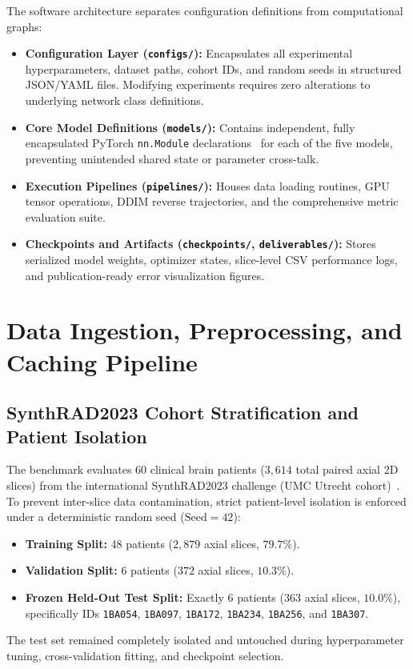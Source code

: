 The software architecture separates configuration definitions from computational graphs:
\begin{itemize}
    \item \textbf{Configuration Layer (\texttt{configs/}):} Encapsulates all experimental hyperparameters, dataset paths, cohort IDs, and random seeds in structured JSON/YAML files. Modifying experiments requires zero alterations to underlying network class definitions.
    \item \textbf{Core Model Definitions (\texttt{models/}):} Contains independent, fully encapsulated PyTorch \texttt{nn.Module} declarations~\cite{paszke2019pytorch} for each of the five models, preventing unintended shared state or parameter cross-talk.
    \item \textbf{Execution Pipelines (\texttt{pipelines/}):} Houses data loading routines, GPU tensor operations, DDIM reverse trajectories, and the comprehensive metric evaluation suite.
    \item \textbf{Checkpoints and Artifacts (\texttt{checkpoints/}, \texttt{deliverables/}):} Stores serialized model weights, optimizer states, slice-level CSV performance logs, and publication-ready error visualization figures.
\end{itemize}

\section{Data Ingestion, Preprocessing, and Caching Pipeline}

\subsection{SynthRAD2023 Cohort Stratification and Patient Isolation}
The benchmark evaluates 60 clinical brain patients ($3,614$ total paired axial 2D slices) from the international SynthRAD2023 challenge (UMC Utrecht cohort)~\cite{thummerer2023synthrad2023,synthrad2023dataset}. To prevent inter-slice data contamination, strict patient-level isolation is enforced under a deterministic random seed ($\text{Seed} = 42$):
\begin{itemize}
    \item \textbf{Training Split:} 48 patients ($2,879$ axial slices, $79.7\%$).
    \item \textbf{Validation Split:} 6 patients ($372$ axial slices, $10.3\%$).
    \item \textbf{Frozen Held-Out Test Split:} Exactly 6 patients ($363$ axial slices, $10.0\%$), specifically IDs \texttt{1BA054}, \texttt{1BA097}, \texttt{1BA172}, \texttt{1BA234}, \texttt{1BA256}, and \texttt{1BA307}.
\end{itemize}
The test set remained completely isolated and untouched during hyperparameter tuning, cross-validation fitting, and checkpoint selection.


